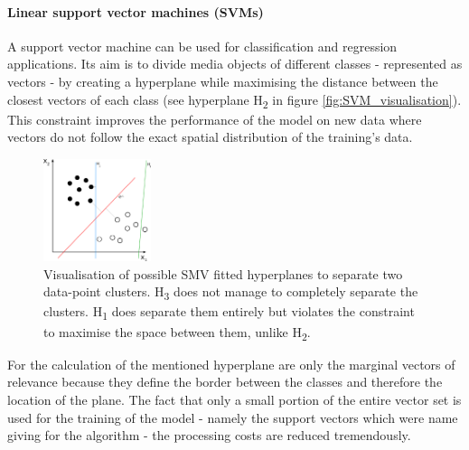 \paragraph{Linear support vector machines (SVMs)}
A support vector machine can be used for classification and regression applications. Its aim is to divide media objects of different classes - represented as vectors - by creating a hyperplane while maximising the distance between the closest vectors of each class (see hyperplane H\textsubscript{2} in figure \ref{fig:SVM_visualisation}). This constraint improves the performance of the model on new data where vectors do not follow the exact spatial distribution of the training's data. 
\begin{figure} %
  \vspace{-0.5cm}
    \centerline{\includegraphics[trim={0 0 0 0},clip,width=0.28\textwidth]{img/Svm_separating_hyperplanes}}
  \caption{Visualisation of possible SMV fitted hyperplanes to separate two data-point clusters. H\textsubscript{3} does not manage to completely separate the clusters. H\textsubscript{1} does separate them entirely but violates the constraint to maximise the space between them, unlike H\textsubscript{2}.}
  \label{fig:ml_visualisation}
\end{figure}

For the calculation of the mentioned hyperplane are only the marginal vectors of relevance because they define the border between the classes and therefore the location of the plane. The fact that only a small portion of the entire vector set is used for the training of the model - namely the support vectors which were name giving for the algorithm - the processing costs are reduced tremendously.


